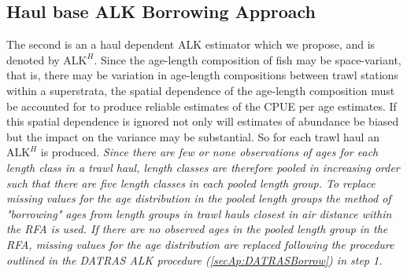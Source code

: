\documentclass[a4paper 12pt]{article}
\numberwithin{equation}{section}
\begin{document}
\subsection{\normalsize Haul base ALK Borrowing Approach}
\label{secAp:oursBorrow}
\indent  The second is an a haul dependent ALK estimator which we propose, and is denoted by $\mathrm{ALK}^{H}$. Since the age-length composition of fish may be space-variant, that is, there may be variation in age-length compositions between trawl stations within a superstrata, the spatial dependence of the age-length composition must be accounted for to produce reliable estimates of the CPUE per age estimates. If this spatial dependence is ignored not only will estimates of abundance be biased but the impact on the variance may be substantial. So for each trawl haul an $\mathrm{ALK}^{H}$ is produced. \emph{Since there are few or none observations of ages for each length class in a trawl haul, length classes are therefore pooled in increasing order such that there are five length classes in each pooled length group. To replace missing values for the age distribution in the pooled length groups the method of "borrowing" ages from length groups in trawl hauls closest in air distance within the RFA is used. If there are no observed ages in the pooled length group in the RFA, missing values for the age distribution are replaced following the procedure outlined in the DATRAS ALK procedure (\ref{secAp:DATRASBorrow}) in step 1.  }
\end{document}
